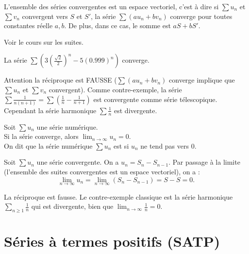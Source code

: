 \documentclass{book}
\begin{document}
\begin{Proposition}
L'ensemble des séries convergentes est un espace vectoriel, c'est à dire si $\sum u_n$ et $\sum v_n$ convergent vers $S$ et $S'$, la série $\sum (a u_n + b v_n)$ converge pour toutes constantes réelle $a,b$. De plus, dans ce cas, le somme est  $aS+bS'$.
\end{Proposition}
\begin{Demonstration}
Voir le cours sur les suites. 
\end{Demonstration}
\begin{Exemple}
La série $\sum \left(3 (\frac{\sqrt{2}}{2})^n-5(0.999)^n\right)$ converge.
\end{Exemple}
\begin{Remarque} Attention la réciproque est FAUSSE ($\sum (a u_n + b v_n)$ converge implique que $\sum u_n$ et $\sum v_n$ convergent).
Comme contre-exemple, la série $\sum \frac{1}{n(n+1)}=\sum \left(\frac{1}{n}-\frac{1}{n+1}\right)$ est convergente comme série télescopique. Cependant la série harmonique $\sum \frac{1}{n}$ est divergente.  
\end{Remarque}






\begin{Proposition}
Soit $\sum u_n$ une série numérique.\\
Si la série converge, alors $ \lim_{n\to\infty}u_n= 0$.\\
On dit que la série numérique $\sum u_n$ est  si $u_n$ ne tend pas vers 0.
\end{Proposition}
\begin{Demonstration}
Soit $\sum u_n$ une série convergente.
On a $u_n = S_{n}-S_{n-1}.$ Par passage à la limite (l'ensemble des suites convergentes est un espace vectoriel), on a  :$$\lim_{n\to\infty}u_n =\lim_{n\to\infty}( S_{n}-S_{n-1})=S-S=0.$$
\end{Demonstration}
\begin{Remarque}
La réciproque est fausse.
Le contre-exemple classique est la série harmonique
$\sum_{n\geq 1} \frac1n$ qui est divergente,
bien que $ \lim_{n\to\infty} \frac1n =0$.
\end{Remarque}
%
%
\section{Séries à termes positifs (SATP)}
\end{document}

